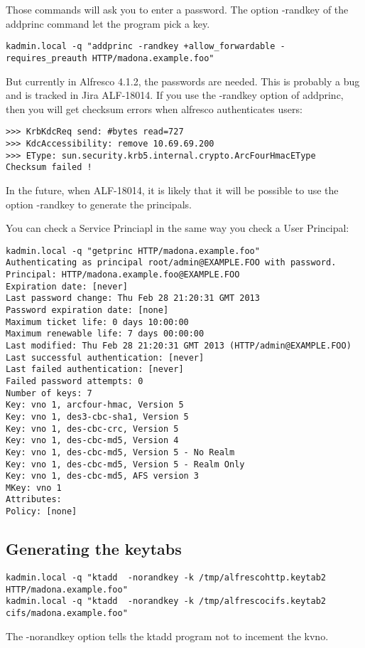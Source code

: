 \documentclass[12pt,a4]{article}
\begin{document}
Those commands will ask you to enter a password.
The option -randkey of the addprinc command let the program pick a key.
\begin{verbatim}
kadmin.local -q "addprinc -randkey +allow_forwardable -requires_preauth HTTP/madona.example.foo"
\end{verbatim}
But currently in Alfresco 4.1.2, the passwords are needed. This is probably a bug and is tracked in Jira ALF-18014.
If you use the -randkey option of addprinc, then you will get checksum errors when alfresco authenticates users:


\begin{verbatim}
>>> KrbKdcReq send: #bytes read=727
>>> KdcAccessibility: remove 10.69.69.200
>>> EType: sun.security.krb5.internal.crypto.ArcFourHmacEType
Checksum failed !
\end{verbatim}
In the future, when ALF-18014, it is likely that it will be possible to use the option -randkey to generate the principals. 



You can check a Service Princiapl in the same way you check a User Principal:


\begin{verbatim}
kadmin.local -q "getprinc HTTP/madona.example.foo"
Authenticating as principal root/admin@EXAMPLE.FOO with password.
Principal: HTTP/madona.example.foo@EXAMPLE.FOO
Expiration date: [never]
Last password change: Thu Feb 28 21:20:31 GMT 2013
Password expiration date: [none]
Maximum ticket life: 0 days 10:00:00
Maximum renewable life: 7 days 00:00:00
Last modified: Thu Feb 28 21:20:31 GMT 2013 (HTTP/admin@EXAMPLE.FOO)
Last successful authentication: [never]
Last failed authentication: [never]
Failed password attempts: 0
Number of keys: 7
Key: vno 1, arcfour-hmac, Version 5
Key: vno 1, des3-cbc-sha1, Version 5
Key: vno 1, des-cbc-crc, Version 5
Key: vno 1, des-cbc-md5, Version 4
Key: vno 1, des-cbc-md5, Version 5 - No Realm
Key: vno 1, des-cbc-md5, Version 5 - Realm Only
Key: vno 1, des-cbc-md5, AFS version 3
MKey: vno 1
Attributes:
Policy: [none]
\end{verbatim}




\subsection{Generating the keytabs}

\begin{verbatim}
kadmin.local -q "ktadd  -norandkey -k /tmp/alfrescohttp.keytab2 HTTP/madona.example.foo"
kadmin.local -q "ktadd  -norandkey -k /tmp/alfrescocifs.keytab2 cifs/madona.example.foo"
\end{verbatim}
The -norandkey option tells the ktadd program not to incement the kvno.
\end{document}

